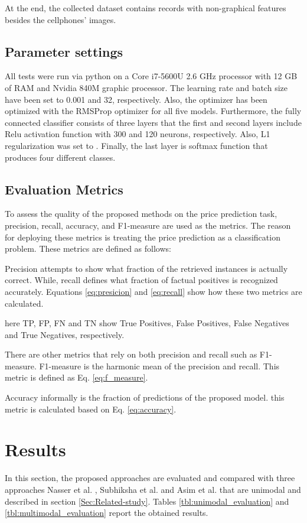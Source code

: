 \documentclass{svjour3}                     \smartqed  \usepackage{graphicx}
\begin{document}
At the end, the collected dataset contains  records with  non-graphical features besides the cellphones' images.


\subsection{Parameter settings}
All tests were run via python on a Core i7-5600U 2.6 GHz processor with 12 GB of RAM and Nvidia 840M graphic processor. The learning rate and batch size have been set to 0.001 and 32, respectively. Also, the optimizer has been optimized with the RMSProp optimizer for all five models. Furthermore, the fully connected classifier consists of three layers that the first and second layers include Relu activation function with 300 and 120 neurons, respectively. Also, L1 regularization was set to . Finally, the last layer is softmax function that produces four different classes.


\subsection{Evaluation Metrics}
To assess the quality of the proposed methods on the price prediction task, precision, recall, accuracy, and F1-measure are used as the metrics. The reason for deploying these metrics is treating the price prediction as a classification problem. These metrics are defined as follows:

Precision attempts to show what fraction of the retrieved instances is actually correct. While, recall defines
what fraction of factual positives is recognized accurately. Equations \ref{eq:presicion} and \ref{eq:recall}
show how these two metrics are calculated.




here TP, FP, FN and TN show True Positives, False Positives, False Negatives and True Negatives, respectively. 

There are other metrics that rely on both precision and recall such as F1-measure. F1-measure is the harmonic mean of the precision and recall. This metric is defined as Eq. \ref{eq:f_measure}.   


Accuracy informally is the fraction of predictions of the proposed model. this metric is calculated based on Eq. \ref{eq:accuracy}.


\section{Results} \label{Subsec:Evaluation}
In this section, the proposed approaches are evaluated and compared with three approaches Nasser et al. \cite{Nasser2019}, Subhiksha et al. \cite{Subhiksha2020} and  Asim et al. \cite{Asim2018} that are unimodal and described in section \ref{Sec:Related-study}. Tables \ref{tbl:unimodal_evaluation} and \ref{tbl:multimodal_evaluation} report the obtained results.
\end{document}
